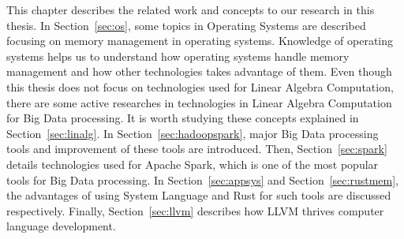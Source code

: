 This chapter describes the related work and concepts to our research in this thesis. 
In Section~\ref{sec:os}, some topics in Operating Systems are described focusing on memory management in operating systems.
Knowledge of operating systems helps us to understand how operating systems handle memory management and 
how other technologies takes advantage of them. Even though this thesis does not focus on technologies used for Linear Algebra Computation, 
there are some active researches in technologies in Linear Algebra Computation for Big Data processing. 
It is worth studying these concepts explained in Section~\ref{sec:linalg}. 
In Section~\ref{sec:hadoopspark}, major Big Data processing tools and improvement of these tools are introduced. 
Then, Section~\ref{sec:spark} details technologies used for Apache Spark, which is one of the most popular tools for Big Data processing.
In Section~\ref{sec:appsys} and Section~\ref{sec:rustmem}, the advantages of using System Language and Rust for such tools are discussed respectively.
Finally, Section~\ref{sec:llvm} describes how LLVM thrives computer language development. 


